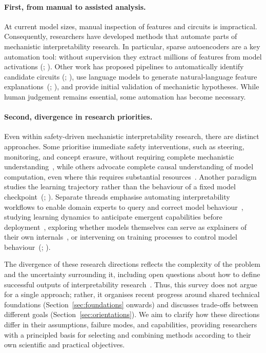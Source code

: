 \paragraph{First, from manual to assisted analysis.} At current model sizes, manual inspection of features and circuits is impractical. Consequently, researchers have developed methods that automate parts of mechanistic interpretability research. In particular, sparse autoencoders are a key automation tool: without supervision they extract millions of features from model activations (; ). Other work has proposed pipelines to automatically identify candidate circuits (; ), use language models to generate natural-language feature explanations~(; ), and provide initial validation of mechanistic hypotheses. While human judgement remains essential, some automation has become necessary.

\paragraph{Second, divergence in research priorities.} Even within safety-driven mechanistic interpretability research, there are distinct approaches. Some prioritise immediate safety interventions, such as steering, monitoring, and concept erasure, without requiring complete mechanistic understanding~, while others advocate complete causal understanding of model computation, even where this requires substantial resources~. Another paradigm studies the learning trajectory rather than the behaviour of a fixed model checkpoint~(; ). Separate threads emphasise automating interpretability workflows to enable domain experts to query and correct model behaviour~, studying learning dynamics to anticipate emergent capabilities before deployment~, exploring whether models themselves can serve as explainers of their own internals~, or intervening on training processes to control model behaviour~(; ).

The divergence of these research directions reflects the complexity of the problem and the uncertainty surrounding it, including open questions about how to define successful outputs of interpretability research~. Thus, this survey does not argue for a single approach; rather, it organises recent progress around shared technical foundations (Section~\ref{sec:foundations} onwards) and discusses trade-offs between different goals (Section~\ref{sec:orientations}). We aim to clarify how these directions differ in their assumptions, failure modes, and capabilities, providing researchers with a principled basis for selecting and combining methods according to their own scientific and practical objectives.

